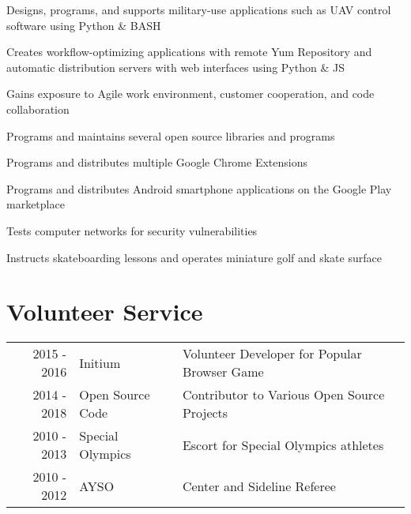 \documentclass[]{resume}
\begin{document}
\begin{minipage}[t]{0.66\textwidth}
\sectionsep

\begin{tightemize}
\item Designs, programs, and supports military-use applications such as UAV control software using Python \& BASH
\item Creates workflow-optimizing applications with remote Yum Repository and automatic distribution servers with web interfaces using Python \& JS
\item Gains exposure to Agile work environment, customer cooperation, and code collaboration
\end{tightemize}

\sectionsep

\descript{}
\begin{tightemize}
\item Programs and maintains several open source libraries and programs
\item Programs and distributes multiple Google Chrome Extensions
\item Programs and distributes Android smartphone applications on the Google Play marketplace
\end{tightemize}

\sectionsep

\begin{tightemize}
\item Tests computer networks for security vulnerabilities
\item Instructs skateboarding lessons and operates miniature golf and skate surface
\end{tightemize}



\section{Volunteer Service}
\begin{tabular}{rll}
2015 - 2016 & Initium           & Volunteer Developer for Popular Browser Game \\
2014 - 2018 & Open Source Code  & Contributor to Various Open Source Projects \\
2010 - 2013 & Special Olympics  & Escort for Special Olympics athletes \\
2010 - 2012 & AYSO              & Center and Sideline Referee \\
\end{tabular}


\end{minipage}
\end{document}
